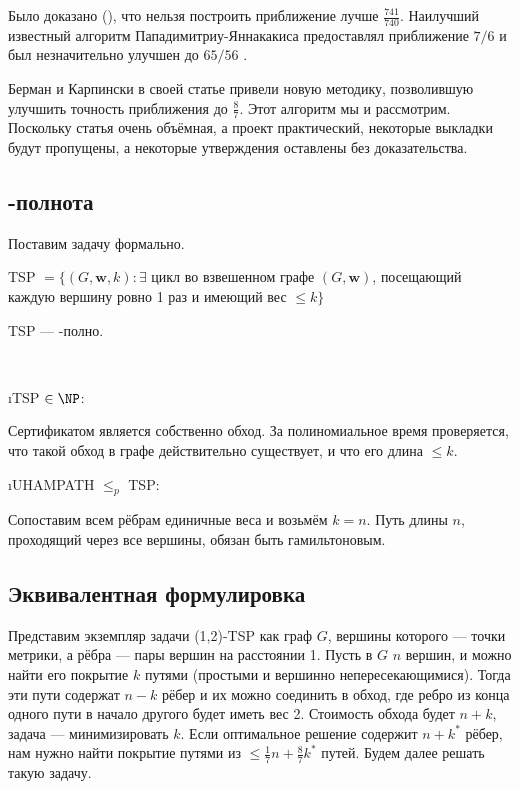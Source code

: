 Было доказано (\cite{EK01}), что нельзя построить приближение лучше $\frac{741}{740}$. Наилучший известный алгоритм Пападимитриу-Яннакакиса \cite{PY93} предоставлял приближение $7/6$ и был незначительно улучшен до $65/56$ \cite{BR05}. 

Берман и Карпински в своей статье \cite{BK06} привели новую методику, позволившую улучшить точность приближения до $\frac{8}{7}$. Этот алгоритм мы и рассмотрим. Поскольку статья очень объёмная, а проект практический, некоторые выкладки будут пропущены, а некоторые утверждения оставлены без доказательства.

\subsection{\NP-полнота}
Поставим задачу формально.

TSP $= \{ (G, \mathbf{w}, k): \exists$ цикл во взвешенном графе $(G, \mathbf{w})$, посещающий каждую вершину ровно 1 раз и имеющий вес $\le k \}$

\begin{theorem}
	TSP --- \NP-полно.
\end{theorem}
\begin{Proof}
 $ $
 
 \begin{itemize}
  \i TSP $\in \NP$\cite{BA09}:
 
  Сертификатом является собственно обход. За полиномиальное время проверяется, что такой обход в графе действительно существует, и что его длина $\le k$.
 
  \i UHAMPATH $\le_p$ TSP: \cite{M17}
 
  Сопоставим всем рёбрам единичные веса и возьмём $k = n$. Путь длины $n$, проходящий через все вершины, обязан быть гамильтоновым. \qedhere
 \end{itemize}
\end{Proof}

\subsection{Эквивалентная формулировка}
Представим экземпляр задачи (1,2)-TSP как граф $G$, вершины которого --- точки метрики, а рёбра --- пары вершин на расстоянии 1. Пусть в $G$ $n$ вершин, и можно найти его покрытие $k$ путями (простыми и вершинно непересекающимися). Тогда эти пути содержат $n-k$ рёбер и их можно соединить в обход, где ребро из конца одного пути в начало другого будет иметь вес 2. Стоимость обхода будет $n+k$, задача --- минимизировать $k$. Если оптимальное решение содержит $n+k^*$ рёбер, нам нужно найти покрытие путями из $\le \frac{1}{7}n+\frac{8}{7}k^*$ путей. Будем далее решать такую задачу.

